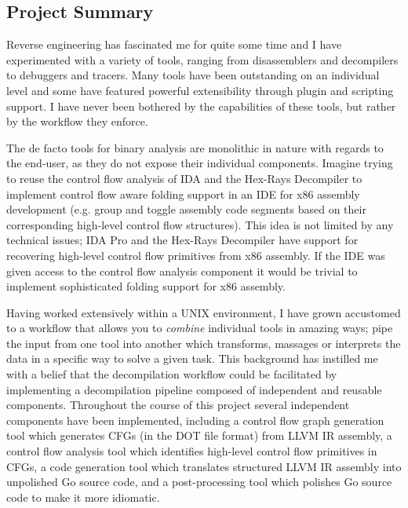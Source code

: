 
\subsection{Project Summary}

Reverse engineering has fascinated me for quite some time and I have experimented with a variety of tools, ranging from disassemblers and decompilers to debuggers and tracers. Many tools have been outstanding on an individual level and some have featured powerful extensibility through plugin and scripting support. I have never been bothered by the capabilities of these tools, but rather by the workflow they enforce.

The de facto tools for binary analysis are monolithic in nature with regards to the end-user, as they do not expose their individual components. Imagine trying to reuse the control flow analysis of IDA and the Hex-Rays Decompiler to implement control flow aware folding support in an IDE for x86 assembly development (e.g. group and toggle assembly code segments based on their corresponding high-level control flow structures). This idea is not limited by any technical issues; IDA Pro and the Hex-Rays Decompiler have support for recovering high-level control flow primitives from x86 assembly. If the IDE was given access to the control flow analysis component it would be trivial to implement sophisticated folding support for x86 assembly.

Having worked extensively within a UNIX environment, I have grown accustomed to a workflow that allows you to \textit{combine} individual tools in amazing ways; pipe the input from one tool into another which transforms, massages or interprets the data in a specific way to solve a given task. This background has instilled me with a belief that the decompilation workflow could be facilitated by implementing a decompilation pipeline composed of independent and reusable components. Throughout the course of this project several independent components have been implemented, including a control flow graph generation tool which generates CFGs (in the DOT file format) from LLVM IR assembly, a control flow analysis tool which identifies high-level control flow primitives in CFGs, a code generation tool which translates structured LLVM IR assembly into unpolished Go source code, and a post-processing tool which polishes Go source code to make it more idiomatic.

